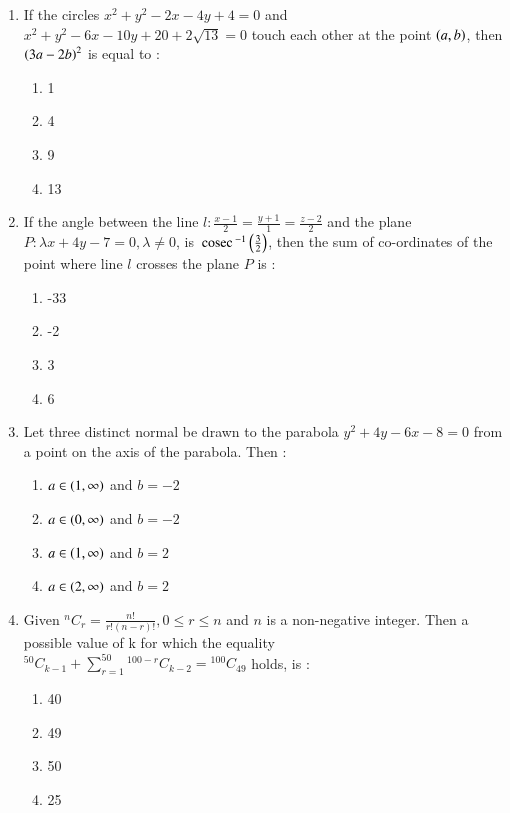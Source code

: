 \documentclass[journal]{IEEEtran}
\begin{document}
\begin{enumerate}[start=16]
\item If the circles $x^2+y^2-2x-4y+4=0$ and $x^2+y^2-6x-10y+20+2\sqrt{13}=0$ touch each other at the point $\left(a,b\right)$, then $\left(3a-2b\right)^2$ is equal to :
\begin{enumerate}
    \item 1
    \item 4
    \item 9
    \item 13
\end{enumerate}

\item If the angle between the line $l:\frac{x-1}{2}=\frac{y+1}{1}=\frac{z-2}{2}$ and the plane $P:\lambda x+4y-7=0, \lambda\neq0$, is $\,\text{cosec}\,^{-1}\left(\frac{3}{2}\right)$, then the sum of co-ordinates of the point where line $l$ crosses the plane $P$  is :
\begin{enumerate}
    \item -33
    \item -2
    \item 3
    \item 6
\end{enumerate}

\item Let three distinct normal be drawn to the parabola $y^2+4y-6x-8=0$ from a point  on the axis of the parabola. Then :
\begin{enumerate}
    \item $a \in \left(1,\infty\right)$ and $b=-2$
    \item $a \in \left(0,\infty\right)$ and $b=-2$
    \item $a \in \left(1,\infty\right)$ and $b=2$
    \item $a \in \left(2,\infty\right)$ and $b=2$
\end{enumerate}

\item Given ${}^{n}C_{r} = \frac{n!}{r!(n-r)!}, 0\leq r \leq n$ and $n$ is a non-negative integer. Then a possible value of k for which the equality\\
${}^{50}C_{k-1}+\sum_{r=1}^{50}{}^{100-r}C_{k-2}={}^{100}C_{49}$ holds, is :
\begin{enumerate}
    \item 40
    \item 49
    \item 50
    \item 25
\end{enumerate}


\end{enumerate}
\end{document}
